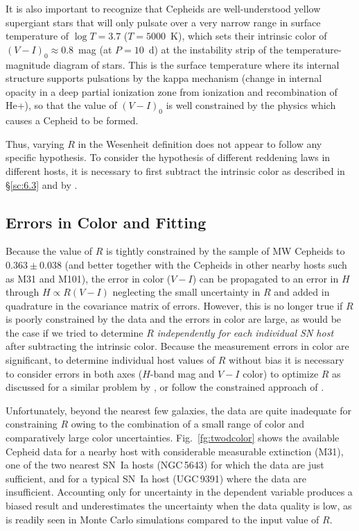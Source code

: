 \documentclass[12pt]{aastex631}
\begin{document}
\begin{appendices}
It is also important to recognize that Cepheids are well-understood yellow supergiant stars that will only pulsate over a very narrow range in surface temperature of $\log T = 3.7$ ($T=5000$~K), which sets their intrinsic color
 of $(V\!-\!I)_0 \approx 0.8$~mag (at $P=10$~d) at the instability strip of the temperature-magnitude diagram of stars.  This is the surface temperature where its internal structure supports pulsations by the kappa mechanism (change in internal opacity in a deep partial ionization zone from ionization and recombination of He+), so that the value of $(V\!-\!I)_0$ is well constrained by the physics which causes a Cepheid to be formed.  

Thus, varying $R$ in the Wesenheit definition does not appear to follow any specific hypothesis. To consider the hypothesis of different reddening laws in different hosts, it is necessary to first subtract the intrinsic color as described in \S\ref{sc:6.3} and by \citet{Follin:2017}.  

\subsection{Errors in Color and Fitting}

Because the value of $R$ is tightly constrained by the sample of MW Cepheids to $0.363\pm 0.038$ (and better together with the Cepheids in other nearby hosts such as M31 and M101), the error in color ($V\!-\!I$) can be propagated to an error in $H$ through $H \propto R(V\!-\!I)$ neglecting the small uncertainty in $R$ and added in quadrature in the covariance matrix of errors.  However, this is no longer true if $R$ is poorly constrained by the data and the errors in color are large, as would be the case if we tried to determine $R$ {\it independently for each individual SN host} after subtracting the intrinsic color.  Because the measurement errors in color are significant, to determine individual host values of $R$ without bias it is necessary to consider errors in both axes ($H$-band mag and $V\!-\!I$ color) to optimize $R$ as discussed for a similar problem by \citet{Tremaine:2002}, or follow the constrained approach of \citet{Follin:2017}.

Unfortunately, beyond the nearest few galaxies, the data are quite inadequate for constraining $R$ owing to the combination of a small range of color and comparatively large color uncertainties.  Fig.~\ref{fg:twodcolor} shows the available Cepheid data for a nearby host with considerable measurable extinction (M31), one of the two nearest SN~Ia hosts (NGC$\,$5643) for which the data are just sufficient, and for a typical SN~Ia host (UGC$\,$9391) where the data are insufficient.  Accounting only for uncertainty in the dependent variable produces a biased result and underestimates the uncertainty when the data quality is low, as is readily seen in Monte Carlo simulations compared to the input value of $R$.


\end{appendices}
\end{document}
